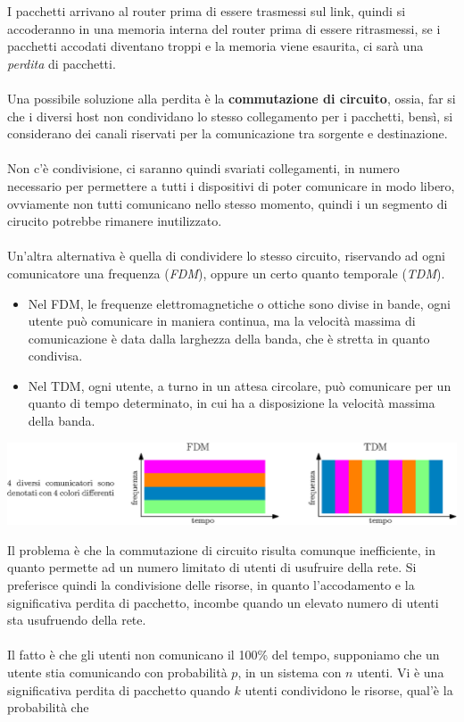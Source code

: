 \documentclass[12pt, letterpaper]{article}
\newcommand{\acc}{\\\hphantom{}\\}
\begin{document}
I pacchetti arrivano al router prima di essere trasmessi sul link, quindi si accoderanno in una memoria interna del router prima
di essere ritrasmessi, se i pacchetti accodati diventano troppi e la memoria viene esaurita, ci sarà una \textit{perdita} di
pacchetti. \acc
Una possibile soluzione alla perdita è la \textbf{commutazione di circuito}, ossia, far si che i diversi host non condividano lo
stesso collegamento per i pacchetti, bensì, si considerano dei canali riservati per la comunicazione tra sorgente e destinazione.\acc
Non c'è condivisione, ci saranno quindi svariati collegamenti, in numero necessario per permettere a tutti i dispositivi di
poter comunicare in modo libero, ovviamente non tutti comunicano nello stesso momento, quindi i un segmento di cirucito potrebbe
rimanere inutilizzato.\acc
Un'altra alternativa è quella di condividere lo stesso circuito, riservando ad ogni comunicatore una frequenza (\textit{FDM}), oppure un certo
quanto temporale (\textit{TDM}).\begin{itemize}
    \item Nel FDM, le frequenze elettromagnetiche o ottiche sono divise in bande, ogni utente può comunicare in maniera continua,
          ma la velocità massima di comunicazione è data dalla larghezza della banda, che è stretta in quanto condivisa.
    \item Nel TDM, ogni utente, a turno in un attesa circolare, può comunicare per un quanto di tempo determinato, in cui ha a
          disposizione la velocità massima della banda.
\end{itemize}\begin{center}
    \includegraphics[width=1\textwidth ]{images/FdmTdm.eps}
\end{center}
Il problema è che la commutazione di circuito risulta comunque inefficiente, in quanto permette ad un numero
limitato di utenti di usufruire della rete. Si preferisce quindi la condivisione delle risorse, in quanto l'accodamento e la
significativa perdita di pacchetto, incombe quando un elevato numero di utenti sta usufruendo della rete.\acc
Il fatto è che gli utenti non comunicano il 100\% del tempo, supponiamo che un utente stia comunicando con probabilità $p$, in un
sistema con $n$ utenti. Vi è una significativa perdita di pacchetto quando $k$ utenti condividono le risorse, qual'è la probabilità che
\end{document}
